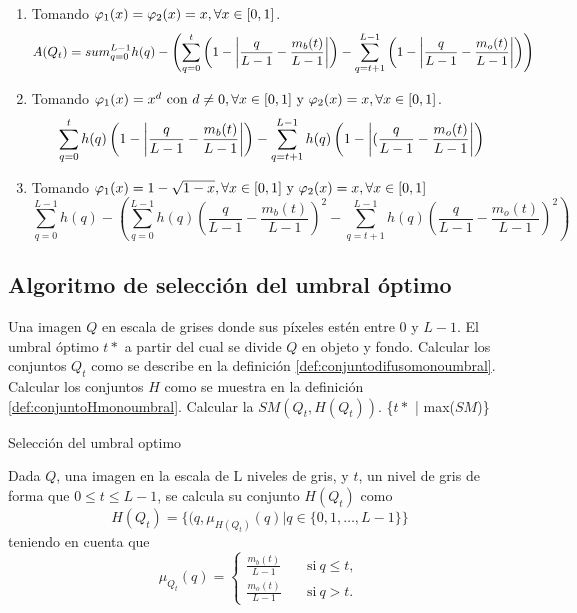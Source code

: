 
\begin{enumerate}\label{enum:funcionesalg2}
    \item Tomando $\varphi_1(x) = \varphi_2(x) = x, \forall x\in[0,1]$.
    $$A(Q_t) = sum_{q=0}^{L-1} h(q) - \left(\sum_{q=0}^{t} \left(1-\left\vert\frac{q}{L-1}-\frac{m_b(t)}{L-1}\right\vert\right) - \sum_{q=t+1}^{L-1} \left(1-\left\vert\frac{q}{L-1}-\frac{m_o(t)}{L-1}\right\vert\right)\right)$$
    \item Tomando $\varphi_1(x) = x^d \text{ con } d\neq0, \forall x\in[0,1] \text{ y } \varphi_2(x)=x, \forall x\in[0,1]$.
    $$\sum_{q=0}^{t} h(q) \left(1-\left\vert\frac{q}{L-1}-\frac{m_b(t)}{L-1}\right\vert\right) - \sum_{q=t+1}^{L-1} h(q) \left(1-\left\vert(\frac{q}{L-1}-\frac{m_o(t)}{L-1}\right\vert\right)$$
    \item Tomando $\varphi_1(x) = 1-\sqrt{1-x}, \forall x\in[0,1] \text{ y } \varphi_2(x)=x,\forall x\in[0,1]$
    $$\sum_{q=0}^{L-1} h(q) - \left(\sum_{q=0}^{L-1} h(q) \left(\frac{q}{L-1}-\frac{m_b(t)}{L-1}\right)^2 - \sum_{q=t+1}^{L-1} h(q) \left(\frac{q}{L-1}-\frac{m_o(t)}{L-1}\right)^2\right)$$
\end{enumerate}

\subsection{Algoritmo de selección del umbral óptimo}

\begin{algorithm}
\begin{algorithmic}[1]
\REQUIRE Una imagen $Q$ en escala de grises donde sus píxeles estén entre $0$ y $L-1$.
\ENSURE El umbral óptimo $t*$ a partir del cual se divide $Q$ en objeto y fondo.
\STATE Calcular los conjuntos $Q_t$ como se describe en la definición \ref{def:conjuntodifusomonoumbral}.
\STATE Calcular los conjuntos $H$ como se muestra en la definición \ref{def:conjuntoHmonoumbral}.
\STATE Calcular la $SM(Q_t, H(Q_t))$.
\ENDFOR
\RETURN \{$t*$ | max($SM$)\}
\end{algorithmic}
\caption{Selección del umbral optimo}\label{alg:algoritmo3}
\end{algorithm}

\begin{definition}\label{def:conjuntoHmonoumbral}
Dada $Q$, una imagen en la escala de L niveles de gris, y $t$, un nivel de gris de forma que $0\leq t\leq L-1$, se calcula su conjunto $H(Q_t)$ como
$$H(Q_t) = \{(q, \mu_{H(Q_t)}(q)|q\in \{0,1,\dots, L-1\}\}$$ 
teniendo en cuenta que
$$\mu_{Q_t}(q) = \left\{ \begin{aligned}
    \frac{m_b(t)}{L-1} & \quad\text{si}\ q\leq t,\\
    \frac{m_o(t)}{L-1} & \quad\text{si}\ q> t.
 \end{aligned}\right.$$
 \end{definition}

